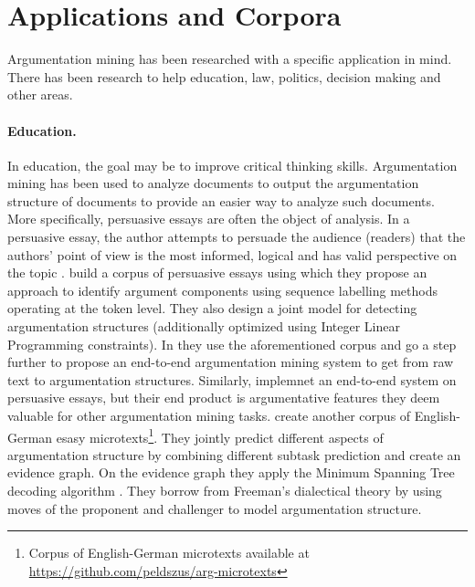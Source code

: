 \section{Applications and Corpora}
\label{sec:applications}

Argumentation mining has been researched with a specific application in mind.
There has been research to help education, law, politics, decision making and
other areas. 

\paragraph{Education.} In education, the goal may be to improve critical thinking skills. 
Argumentation mining has been used to analyze documents to output 
the argumentation structure of documents to provide an easier way to analyze
such documents. More specifically, persuasive essays are often 
the object of analysis. In a persuasive essay, the author attempts 
to persuade the audience (readers) that the authors' point of view is the
most informed, logical and has valid perspective on the topic 
\citep{cabrio2018five}. \citet{stab2017parsing} build a corpus of persuasive
essays using which they propose an approach to identify argument components
using sequence labelling methods operating at the token level. They also design
a joint model for detecting argumentation structures (additionally optimized
using Integer Linear Programming constraints). In \citep{eger2017neural}
they use the aforementioned corpus and go a step further to propose 
an end-to-end argumentation mining system to get from raw text to 
argumentation structures. Similarly, \citet{nguyen2018argument}
implemnet an end-to-end system on persuasive essays, but their end
product is argumentative features they deem valuable for 
other argumentation mining tasks. 
\citet{peldszus2015joint} create another corpus of English-German esasy
microtexts\footnote{Corpus of English-German microtexts available at 
\url{https://github.com/peldszus/arg-microtexts}}. They 
jointly predict different
aspects of argumentation structure by combining different 
subtask prediction and create an evidence graph. On the evidence graph
they apply the Minimum Spanning Tree decoding algorithm \citep{raidl2000weighted}.
They borrow from Freeman's dialectical theory by using moves
of the proponent and challenger to model argumentation structure.

